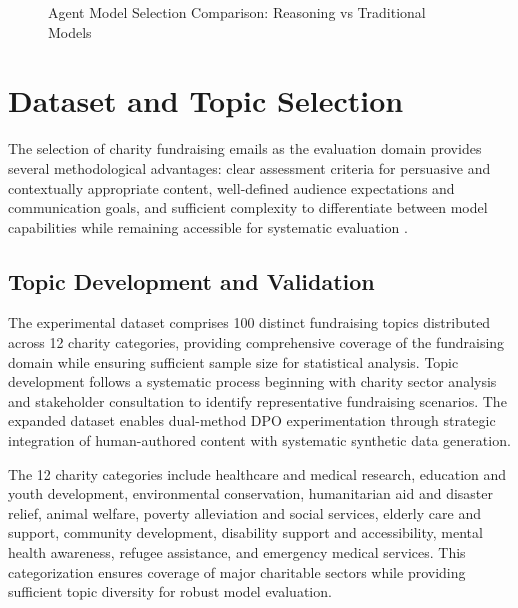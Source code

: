
\begin{figure}[htbp]
    \centering
    \caption{Agent Model Selection Comparison: Reasoning vs Traditional Models}
    \label{fig:agent-model-selection}
\end{figure}

\section{Dataset and Topic Selection}
\label{sec:dataset-topic-selection}

The selection of charity fundraising emails as the evaluation domain provides several methodological advantages: clear assessment criteria for persuasive and contextually appropriate content, well-defined audience expectations and communication goals, and sufficient complexity to differentiate between model capabilities while remaining accessible for systematic evaluation \cite{zhang2019email_subject, pauli2024persuasive_language}.

\subsection{Topic Development and Validation}

The experimental dataset comprises 100 distinct fundraising topics distributed across 12 charity categories, providing comprehensive coverage of the fundraising domain while ensuring sufficient sample size for statistical analysis. Topic development follows a systematic process beginning with charity sector analysis and stakeholder consultation to identify representative fundraising scenarios. The expanded dataset enables dual-method DPO experimentation through strategic integration of human-authored content with systematic synthetic data generation.

The 12 charity categories include healthcare and medical research, education and youth development, environmental conservation, humanitarian aid and disaster relief, animal welfare, poverty alleviation and social services, elderly care and support, community development, disability support and accessibility, mental health awareness, refugee assistance, and emergency medical services. This categorization ensures coverage of major charitable sectors while providing sufficient topic diversity for robust model evaluation.

